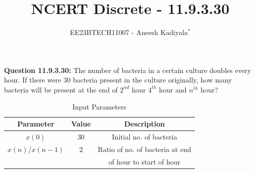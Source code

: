 \documentclass[journal,12pt,twocolumn]{IEEEtran}
\theoremstyle{remark}
\begin{document}

\vspace{3cm}

\title{NCERT Discrete - 11.9.3.30}
\author{EE23BTECH11007 - Aneesh Kadiyala$^{*}$%
}
\maketitle
\newpage
\bigskip

\renewcommand{\thefigure}{\theenumi}
\renewcommand{\thetable}{\theenumi}

\vspace{3cm}
\textbf{Question 11.9.3.30:} The number of bacteria in a certain culture doubles every hour. If there were 30 bacteria present in the culture originally, how many bacteria will be present at the end of $2^{nd}$ hour $4^{th}$ hour and $n^{th}$ hour?
\\
\solution

\begin{table}[h!]
    \centering
    \caption{Input Parameters}
    \label{tab:1}
    \begin{tabular}{ | c | c | c | }
        \hline
        Parameter & Value & Description \\
        \hline
        $x(0)$ & 30 & Initial no. of bacteria\\
        $x(n)/x(n - 1)$ & 2 & Ratio of no. of bacteria at end \\
        & & of hour to start of hour \\
        \hline
    \end{tabular}
\end{table}
\end{document}
